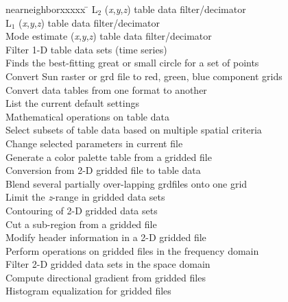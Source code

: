 \begin{tabbing}
nearneighborxxxxx \=					\kill
{}	\>	L$_2$ ({\it x},{\it y},{\it z}) table data filter/decimator \\ 
	\>	L$_1$ ({\it x},{\it y},{\it z}) table data filter/decimator \\ 
	\>	Mode estimate ({\it x},{\it y},{\it z}) table data filter/decimator \\ 
	\>	Filter 1-D table data sets (time series) \\ 
	\>	Finds the best-fitting great or small circle for a set of points \\ 
	\>	Convert Sun raster or grd file to red, green, blue component grids \\ 
	\>	Convert data tables from one format to another \\ 
	\>	List the current default settings \\ 
	\>	Mathematical operations on table data \\ 
	\>	Select subsets of table data based on multiple spatial criteria \\ 
	\>	Change selected parameters in current  file \\ 
	\>	Generate a color palette table from a gridded file \\ 
	\>	Conversion from 2-D gridded file to table data \\ 
	\>	Blend several partially over-lapping grdfiles onto one grid \\ 
	\>	Limit the {\it z}-range in gridded data sets \\ 
	\>	Contouring of 2-D gridded data sets \\ 
	\>	Cut a sub-region from a gridded file \\ 
	\>	Modify header information in a 2-D gridded file \\ 
	\>	Perform operations on gridded files in the frequency domain \\ 
	\>	Filter 2-D gridded data sets in the space domain \\ 
	\>	Compute directional gradient from gridded files \\ 
	\>	Histogram equalization for gridded files \\ 

\end{tabbing}

